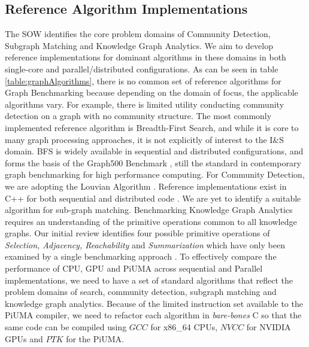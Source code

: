 \documentclass[letterpaper, 10pt]{article}
\begin{document}
\begin{multicols}{2}
        \subsection{Reference Algorithm Implementations}
        \par{The SOW identifies the core problem domains of Community Detection, Subgraph Matching and Knowledge Graph Analytics. 
        We aim to develop reference implementations for dominant algorithms in these domains in both single-core and parallel/distributed configurations.
        As can be seen in table \ref{table:graphAlgorithms}, there is no common set of reference algorithms for Graph Benchmarking because depending on the domain of focus, the applicable algorithms vary. 
        For example, there is limited utility conducting community detection on a graph with no community structure.
        The most commonly implemented reference algorithm is Breadth-First Search, and while it is core to many graph processing approaches, it is not explicitly of interest to the I\&S domain. 
        BFS is widely available in sequential and distributed configurations, and forms the basis of the Graph500 Benchmark \cite{Murphy2010}, still the standard in contemporary graph benchmarking for high performance computing.
        For Community Detection, we are adopting the Louvian Algorithm \cite{Blondel2008}. Reference implementations exist in C++ for both sequential and distributed code \cite{Ghosh2018}. 
        We are yet to identify a suitable algorithm for sub-graph matching.
        Benchmarking Knowledge Graph Analytics requires an understanding of the primitive operations common to all knowledge graphs. 
        Our initial review identifies four possible primitive operations of \textit{Selection, Adjacency, Reachability} and \textit{Summarization} which have only been examined by a single benchmarking approach \cite{Angles2013}. 
        To effectively compare the performance of CPU, GPU and PiUMA across sequential and Parallel implementations, we need to have a set of standard algorithms that reflect the problem domains of search, community detection, subgraph matching and knowledge graph analytics. 
        Because of the limited instruction set available to the PiUMA compiler, we need to refactor each algorithm in \textit{bare-bones} C so that the same code can be compiled using $GCC$ for x86\_64 CPUs, $NVCC$ for NVIDIA GPUs and $PTK$ for the PiUMA}.


\end{multicols}
\end{document}
